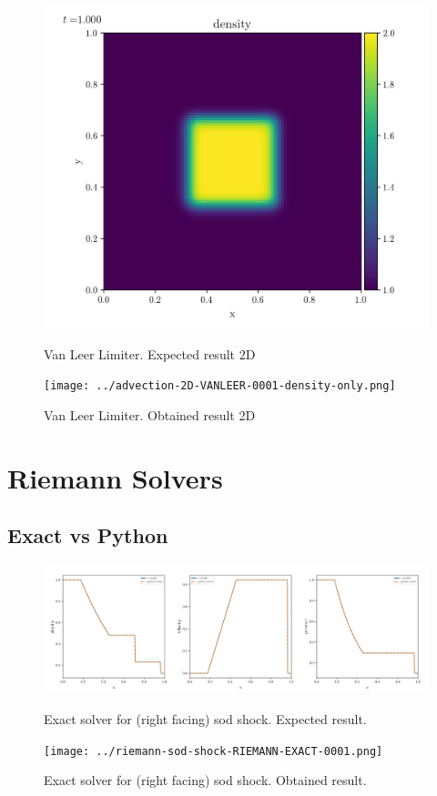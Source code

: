     \begin{figure}[htbp]
        \centering
        \includegraphics[width=.7\textwidth]{./figures/advection-2D-VANLEER-0001-density-only.png}%
        \caption{Van Leer Limiter. Expected result 2D}
        \texttt{[image: ../advection-2D-VANLEER-0001-density-only.png]}%
        \caption{Van Leer Limiter. Obtained result 2D}
    \end{figure}












\clearpage
\section{Riemann Solvers}


\subsection{Exact vs Python}


    \begin{figure}[htbp]
        \centering
        \includegraphics[width=.9\textwidth]{./figures/riemann-sod-shock-RIEMANN-EXACT-overplotted.png}%
        \caption{Exact solver for (right facing) sod shock. Expected result.}
        \texttt{[image: ../riemann-sod-shock-RIEMANN-EXACT-0001.png]}%
        \caption{Exact solver for (right facing) sod shock. Obtained result.}
    \end{figure}


